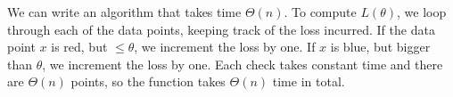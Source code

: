 \begin{soln}
    We can write an algorithm that takes time $\Theta(n)$. To compute
    $L(\theta)$, we loop through each of the data points, keeping track of the
    loss incurred. If the data point $x$ is red, but $\leq \theta$, we
    increment the loss by one. If $x$ is blue, but bigger than $\theta$, we
    increment the loss by one. Each check takes constant time and there are
    $\Theta(n)$ points, so the function takes $\Theta(n)$ time in total.

    \inputminted{python}{\solutiondir/compute_ell.py}

\end{soln}
